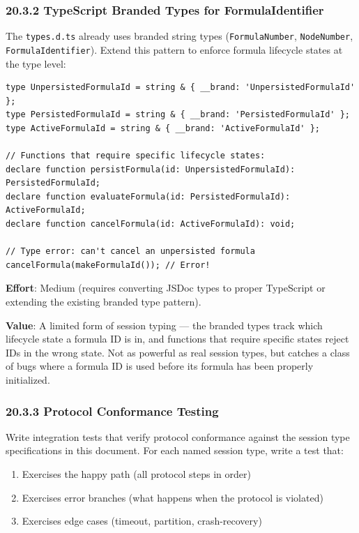 \documentclass[11pt]{article}
\begin{document}
\subsubsection{20.3.2 TypeScript Branded Types for FormulaIdentifier}
\label{sec:org5259646}

The \texttt{types.d.ts} already uses branded string types (\texttt{FormulaNumber},
\texttt{NodeNumber}, \texttt{FormulaIdentifier}). Extend this pattern to enforce formula
lifecycle states at the type level:

\begin{verbatim}
type UnpersistedFormulaId = string & { __brand: 'UnpersistedFormulaId' };
type PersistedFormulaId = string & { __brand: 'PersistedFormulaId' };
type ActiveFormulaId = string & { __brand: 'ActiveFormulaId' };

// Functions that require specific lifecycle states:
declare function persistFormula(id: UnpersistedFormulaId): PersistedFormulaId;
declare function evaluateFormula(id: PersistedFormulaId): ActiveFormulaId;
declare function cancelFormula(id: ActiveFormulaId): void;

// Type error: can't cancel an unpersisted formula
cancelFormula(makeFormulaId()); // Error!
\end{verbatim}

\textbf{Effort}: Medium (requires converting JSDoc types to proper TypeScript or
extending the existing branded type pattern).

\textbf{Value}: A limited form of session typing — the branded types track which
lifecycle state a formula ID is in, and functions that require specific
states reject IDs in the wrong state. Not as powerful as real session types,
but catches a class of bugs where a formula ID is used before its formula
has been properly initialized.
\subsubsection{20.3.3 Protocol Conformance Testing}
\label{sec:orgca74a31}

Write integration tests that verify protocol conformance against the
session type specifications in this document. For each named session type,
write a test that:

\begin{enumerate}
\item Exercises the happy path (all protocol steps in order)
\item Exercises error branches (what happens when the protocol is violated)
\item Exercises edge cases (timeout, partition, crash-recovery)
\end{enumerate}
\end{document}

